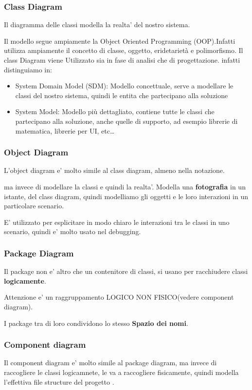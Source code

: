 \subsubsection{Class Diagram}
Il diagramma delle classi modella la realta' del nostro sistema.

Il modello segue ampiamente la Object Oriented Programming (OOP).Infatti utilizza ampiamente
il concetto di classe, oggetto, eridetariet\`a e polimorfismo.
Il class Diagram viene Utilizzato sia in fase di analisi che di progettazione.
infatti distinguiamo in:
\begin{itemize}
    \item System Domain Model (SDM):
        Modello concettuale, serve a modellare le classi del nostro sistema, quindi le entita
        che partecipano alla soluzione
    \item System Model:
        Modello pi\`u dettagliato, contiene tutte le classi che partecipano alla soluzione, 
        anche quelle di supporto, ad esempio librerie di matematica, librerie per UI, etc\dots
\end{itemize}
\subsubsection{Object Diagram}
L'object diagram e' molto simile al class diagram, almeno nella notazione.

ma invece di modellare la classi e quindi la realta'.
Modella una \textbf{fotografia} in un istante, del class diagram, quindi modelliamo gli
oggetti e le loro interazioni in un particolare scenario.

E' utilizzato per esplicitare in modo chiaro le interazioni tra le classi in uno scenario, 
quindi e' molto usato nel debugging.

\subsubsection{Package Diagram}
Il package non e' altro che un contenitore di classi,
si usano per racchiudere classi \textbf{logicamente}.

Attenzione e' un raggruppamento LOGICO NON FISICO(vedere component diagram).

I package tra di loro condividono lo stesso \textbf{Spazio dei nomi}.

\subsubsection{Component diagram}
Il component diagram e' molto simile al package diagram, ma invece di raccogliere le classi
logicamnete, le va a raccogliere fisicamente, quindi modella l'effettiva file structure del progetto
.

